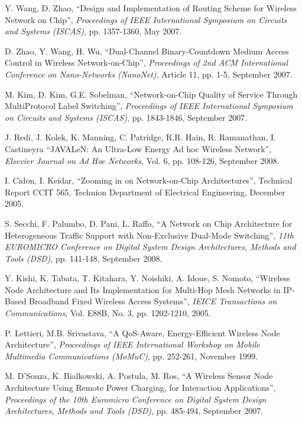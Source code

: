 \documentclass[10pt,times,epsfig,psfig,twocolumn,algorithm,algorithmic]{IEEEtran}
\begin{document}
\begin{thebibliography}{99}

 Y. Wang, D. Zhao, ``Design and Implementation of Routing Scheme for Wireless Network on Chip'', {\it Proceedings of IEEE International Symposium on Circuits and Systems (ISCAS)}, pp. 1357-1360, May 2007.

 D. Zhao, Y. Wang, H. Wu, ``Dual-Channel Binary-Countdown Medium Access Control in Wireless Network-on-Chip'', {\it Proceedings of 2nd ACM International Conference on Nano-Networks (NanoNet)}, Article 11, pp. 1-5, September 2007. 

 M. Kim, D. Kim, G.E. Sobelman, ``Network-on-Chip Quality of Service Through MultiProtocol Label Switching'', {\it Proceedings of IEEE International Symposium on Circuits and Systems (ISCAS)}, pp. 1843-1846, September 2007.

 J. Redi, J. Kolek, K. Manning, C. Patridge, R.R. Hain, R. Ramanathan, I. Castineyra ``JAVALeN: An Ultra-Low Energy Ad hoc Wireless Network'', {\it Elsevier Journal on Ad Hoc Networks}, Vol. 6, pp. 108-126, September 2008. 

 I. Cidon, I. Keidar, ``Zooming in on Network-on-Chip Architectures'', Technical Report CCIT 565, Technion Department of Electrical Engineering, December 2005.

 S. Secchi, F. Palumbo, D. Pani, L. Raffo, ``A Network on Chip Architecture for Heterogeneous Traffic Support with Non-Exclusive Dual-Mode Switching'', {\it 11th EUROMICRO Conference on Digital System Design Architectures, Methods and Tools (DSD)},  pp. 141-148, September 2008.

 Y. Kishi,  K. Tabata, T. Kitahara, Y. Noishiki, A. Idoue, S. Nomoto, ``Wireless Node Architecture and Its Implementation for Multi-Hop Mesh Networks in IP-Based Broadband Fixed Wireless Access Systems'', {\it IEICE Transactions on Communications},  Vol. E88B, No. 3, pp. 1202-1210, 2005.

 P. Lettieri,  M.B. Srivastava, ``A QoS-Aware, Energy-Efficient Wireless Node Architecture'', {\it Proceedings of IEEE International Workshop on Mobile Multimedia Communications (MoMuC)}, pp. 252-261, November 1999.

 M. D'Souza, K. Bialkowski, A. Postula, M. Ros, ``A Wireless Sensor Node Architecture Using Remote Power Charging, for Interaction Applications'', {\it Proceedings of the 10th Euromicro Conference on Digital System Design Architectures, Methods and Tools (DSD)}, pp. 485-494, September 2007. 


\end{thebibliography}
\end{document}
